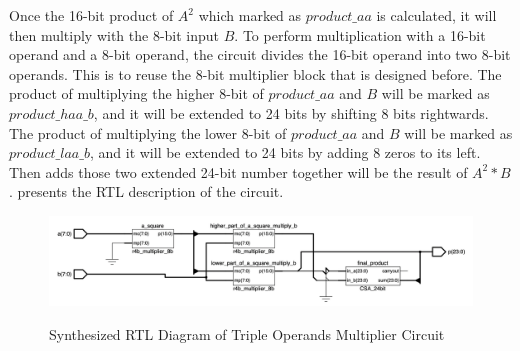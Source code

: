 Once the 16-bit product of \textbf{\(A^2\)} which marked as \(product\_aa\) is calculated, it will then multiply with the 8-bit input \(B\).
To perform multiplication with a 16-bit operand and a 8-bit operand, the circuit divides the 16-bit operand into two 8-bit operands.
This is to reuse the 8-bit multiplier block that is designed before.
The product of multiplying the higher 8-bit of \(product\_aa\) and \(B\) will be marked as \(product\_haa\_b\), and it will be extended to 24 bits by shifting 8 bits rightwards.
The product of multiplying the lower 8-bit of \(product\_aa\) and \(B\) will be marked as \(product\_laa\_b\), and it will be extended to 24 bits by adding 8 zeros to its left.
Then adds those two extended 24-bit number together will be the result of \textbf{\(A^2 \ast B\)}.
 presents the RTL description of the circuit.

\begin{figure}[!ht]
	\centering
	\caption{Synthesized RTL Diagram of Triple Operands Multiplier Circuit}
	\includegraphics[width=\textwidth]{../img/tri_rtl.png}
	\label{fig:tri_rtl}
\end{figure}
